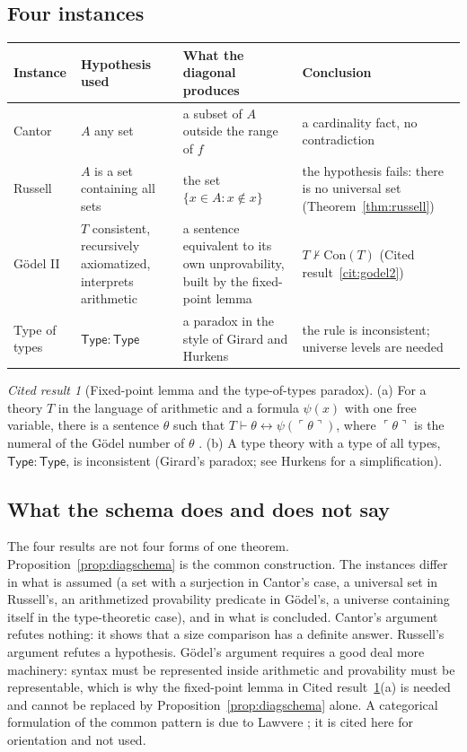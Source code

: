 \documentclass[11pt]{article}
\newcommand{\Type}{\mathsf{Type}}
\theoremstyle{definition}
\theoremstyle{plain}
\theoremstyle{remark}
\newtheorem{cited}[definition]{Cited result}
\begin{document}
\subsection{Four instances}

\begin{center}
\small
\begin{tabular}{@{}p{}p{}p{}p{}@{}}
\toprule
Instance & Hypothesis used & What the diagonal produces & Conclusion\\
\midrule
Cantor & $A$ any set & a subset of $A$ outside the range of $f$ & a cardinality fact, no contradiction\\
Russell & $A$ is a set containing all sets & the set $\{x\in A:x\notin x\}$ & the hypothesis fails: there is no universal set (Theorem~\ref{thm:russell})\\
G\"odel II & $T$ consistent, recursively axiomatized, interprets arithmetic & a sentence equivalent to its own unprovability, built by the fixed-point lemma & $T\nvdash\mathrm{Con}(T)$ (Cited result~\ref{cit:godel2})\\
Type of types & $\Type:\Type$ & a paradox in the style of Girard and Hurkens & the rule is inconsistent; universe levels are needed\\
\bottomrule
\end{tabular}
\end{center}

\begin{cited}[Fixed-point lemma and the type-of-types paradox]\label{cit:diag}
(a) For a theory $T$ in the language of arithmetic and a formula $\psi(x)$ with one free variable, there is a sentence $\theta$ such that $T\vdash\theta\leftrightarrow\psi(\ulcorner\theta\urcorner)$, where $\ulcorner\theta\urcorner$ is the numeral of the G\"odel number of $\theta$ \cite{BBJ07}. (b) A type theory with a type of all types, $\Type:\Type$, is inconsistent (Girard's paradox; see Hurkens \cite{Hurkens95} for a simplification).
\end{cited}

\subsection{What the schema does and does not say}

The four results are not four forms of one theorem. Proposition~\ref{prop:diagschema} is the common construction. The instances differ in what is assumed (a set with a surjection in Cantor's case, a universal set in Russell's, an arithmetized provability predicate in G\"odel's, a universe containing itself in the type-theoretic case), and in what is concluded. Cantor's argument refutes nothing: it shows that a size comparison has a definite answer. Russell's argument refutes a hypothesis. G\"odel's argument requires a good deal more machinery: syntax must be represented inside arithmetic and provability must be representable, which is why the fixed-point lemma in Cited result~\ref{cit:diag}(a) is needed and cannot be replaced by Proposition~\ref{prop:diagschema} alone. A categorical formulation of the common pattern is due to Lawvere \cite{Lawvere69}; it is cited here for orientation and not used.
\end{document}
